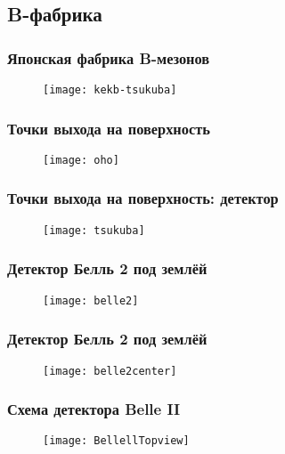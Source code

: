\subsection{B-фабрика}
\begin{frame}
    \frametitle{Японская фабрика B-мезонов}
    \begin{figure}
        \begin{centering}
            \texttt{[image: kekb-tsukuba]}
        \end{centering}
    \end{figure}
\end{frame}
\begin{frame}
    \frametitle{Точки выхода на поверхность}
    \begin{figure}
        \begin{centering}
            \texttt{[image: oho]}
        \end{centering}
    \end{figure}
\end{frame}
\begin{frame}
    \frametitle{Точки выхода на поверхность: детектор}
    \begin{figure}
        \begin{centering}
            \texttt{[image: tsukuba]}
        \end{centering}
    \end{figure}
\end{frame}
\begin{frame}
    \frametitle{Детектор Белль 2 под землёй}
    \begin{figure}
        \begin{centering}
            \texttt{[image: belle2]}
        \end{centering}
    \end{figure}
\end{frame}
\begin{frame}
    \frametitle{Детектор Белль 2 под землёй}
    \begin{figure}
        \begin{centering}
            \texttt{[image: belle2center]}
        \end{centering}
    \end{figure}
\end{frame}
\begin{frame}
    \frametitle{Схема детектора Belle II}
    \begin{figure}
        \begin{centering}
            \texttt{[image: BellellTopview]}
        \end{centering}
    \end{figure}
\end{frame}
